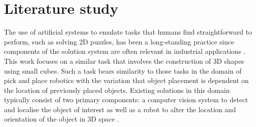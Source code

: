 
\section{Literature study}

%
%
%


The use of artificial systems to emulate tasks that humans find straightforward to perform, such as solving 2D puzzles, has been a long-standing practice since components of the solution system are often relevant in industrial applications \cite{Burdea:Solving_Jigsaw_Puzzles_by_a_Robot}. This work focuses on a similar task that involves the construction of 3D shapes using small cubes. Such a task bears similarity to those tasks in the domain of pick and place robotics with the variation that object placement is dependent on the location of previously placed objects. Existing solutions in this domain typically consist of two primary components: a computer vision system to detect and localise the object of interest as well as a robot to alter the location and orientation of the object in 3D space \cite{Sharath:Gantry_Robot_Design}.


%
%


